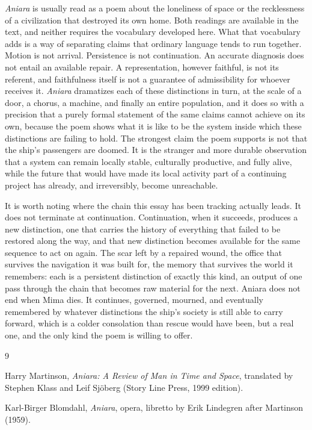\documentclass[11pt]{article}
\begin{document}
\emph{Aniara} is usually read as a poem about the loneliness of space or the recklessness of a civilization that destroyed its own home. Both readings are available in the text, and neither requires the vocabulary developed here. What that vocabulary adds is a way of separating claims that ordinary language tends to run together. Motion is not arrival. Persistence is not continuation. An accurate diagnosis does not entail an available repair. A representation, however faithful, is not its referent, and faithfulness itself is not a guarantee of admissibility for whoever receives it. \emph{Aniara} dramatizes each of these distinctions in turn, at the scale of a door, a chorus, a machine, and finally an entire population, and it does so with a precision that a purely formal statement of the same claims cannot achieve on its own, because the poem shows what it is like to be the system inside which these distinctions are failing to hold. The strongest claim the poem supports is not that the ship's passengers are doomed. It is the stranger and more durable observation that a system can remain locally stable, culturally productive, and fully alive, while the future that would have made its local activity part of a continuing project has already, and irreversibly, become unreachable.

It is worth noting where the chain this essay has been tracking actually leads. It does not terminate at continuation. Continuation, when it succeeds, produces a new distinction, one that carries the history of everything that failed to be restored along the way, and that new distinction becomes available for the same sequence to act on again. The scar left by a repaired wound, the office that survives the navigation it was built for, the memory that survives the world it remembers: each is a persistent distinction of exactly this kind, an output of one pass through the chain that becomes raw material for the next. Aniara does not end when Mima dies. It continues, governed, mourned, and eventually remembered by whatever distinctions the ship's society is still able to carry forward, which is a colder consolation than rescue would have been, but a real one, and the only kind the poem is willing to offer.

\begin{thebibliography}{9}

Harry Martinson, \emph{Aniara: A Review of Man in Time and Space}, translated by Stephen Klass and Leif Sj\"oberg (Story Line Press, 1999 edition).

Karl-Birger Blomdahl, \emph{Aniara}, opera, libretto by Erik Lindegren after Martinson (1959).

\end{thebibliography}
\end{document}
